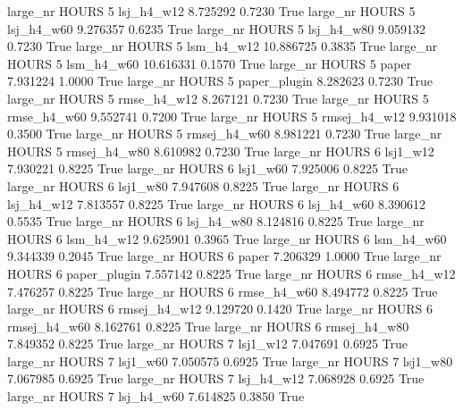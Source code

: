   large_nr    HOURS                 5   lsj_h4_w12    8.725292      0.7230    True
  large_nr    HOURS                 5   lsj_h4_w60    9.276357      0.6235    True
  large_nr    HOURS                 5   lsj_h4_w80    9.059132      0.7230    True
  large_nr    HOURS                 5   lsm_h4_w12   10.886725      0.3835    True
  large_nr    HOURS                 5   lsm_h4_w60   10.616331      0.1570    True
  large_nr    HOURS                 5        paper    7.931224      1.0000    True
  large_nr    HOURS                 5 paper_plugin    8.282623      0.7230    True
  large_nr    HOURS                 5  rmse_h4_w12    8.267121      0.7230    True
  large_nr    HOURS                 5  rmse_h4_w60    9.552741      0.7200    True
  large_nr    HOURS                 5 rmsej_h4_w12    9.931018      0.3500    True
  large_nr    HOURS                 5 rmsej_h4_w60    8.981221      0.7230    True
  large_nr    HOURS                 5 rmsej_h4_w80    8.610982      0.7230    True
  large_nr    HOURS                 6     lsj1_w12    7.930221      0.8225    True
  large_nr    HOURS                 6     lsj1_w60    7.925006      0.8225    True
  large_nr    HOURS                 6     lsj1_w80    7.947608      0.8225    True
  large_nr    HOURS                 6   lsj_h4_w12    7.813557      0.8225    True
  large_nr    HOURS                 6   lsj_h4_w60    8.390612      0.5535    True
  large_nr    HOURS                 6   lsj_h4_w80    8.124816      0.8225    True
  large_nr    HOURS                 6   lsm_h4_w12    9.625901      0.3965    True
  large_nr    HOURS                 6   lsm_h4_w60    9.344339      0.2045    True
  large_nr    HOURS                 6        paper    7.206329      1.0000    True
  large_nr    HOURS                 6 paper_plugin    7.557142      0.8225    True
  large_nr    HOURS                 6  rmse_h4_w12    7.476257      0.8225    True
  large_nr    HOURS                 6  rmse_h4_w60    8.494772      0.8225    True
  large_nr    HOURS                 6 rmsej_h4_w12    9.129720      0.1420    True
  large_nr    HOURS                 6 rmsej_h4_w60    8.162761      0.8225    True
  large_nr    HOURS                 6 rmsej_h4_w80    7.849352      0.8225    True
  large_nr    HOURS                 7     lsj1_w12    7.047691      0.6925    True
  large_nr    HOURS                 7     lsj1_w60    7.050575      0.6925    True
  large_nr    HOURS                 7     lsj1_w80    7.067985      0.6925    True
  large_nr    HOURS                 7   lsj_h4_w12    7.068928      0.6925    True
  large_nr    HOURS                 7   lsj_h4_w60    7.614825      0.3850    True
